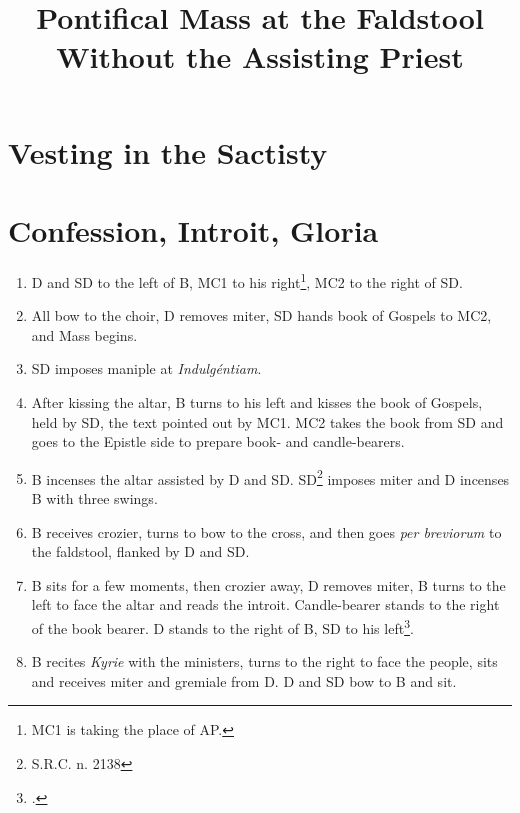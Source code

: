 \documentclass[letterpaper]{article}
\title{Pontifical Mass at the Faldstool\\\small Without the Assisting Priest}
\begin{document}
\maketitle


\section{Vesting in the Sactisty}


\section{Confession, Introit, Gloria}

\begin{enumerate} 

    \item D and SD to the left of B, MC1 to his right\footnote{MC1 is taking
        the place of AP.}, MC2 to the right of SD.

    \item All bow to the choir, D removes miter, SD hands book of Gospels to
        MC2, and Mass begins.

    \item SD imposes maniple at \textit{Indulgéntiam}.

    \item After kissing the altar, B turns to his left and kisses the book of
        Gospels, held by SD, the text pointed out by MC1. MC2 takes the book
        from SD and goes to the Epistle side to prepare book- and candle-bearers.

    \item B incenses the altar assisted by D and SD. SD\footnote{S.R.C. n.
        2138} imposes miter and D incenses B with three swings.

    \item B receives crozier, turns to bow to the cross, and then goes
        \textit{per breviorum} to the faldstool, flanked by D and SD.

    \item B sits for a few moments, then crozier away, D removes miter, B turns
        to the left to face the altar and reads the introit. Candle-bearer
        stands to the right of the book bearer. D stands to the right of B, SD
        to his left\footcite[See note 5, p. 241,][]{stehle}.

    \item B recites \textit{Kyrie} with the ministers, turns to the right to
        face the people, sits and receives miter and gremiale from D. D and SD bow to B and sit.


\end{enumerate}
\end{document}
